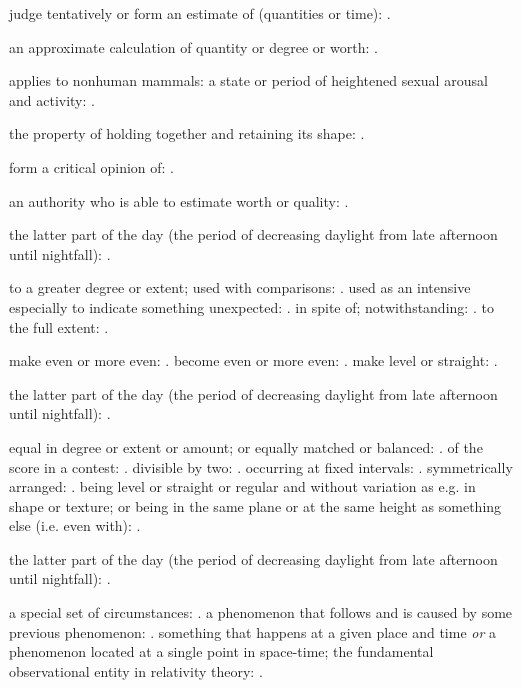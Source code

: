   judge tentatively or form an estimate of (quantities or time): .

  an approximate calculation of quantity or degree or worth: .

  applies to nonhuman mammals: a state or period of heightened sexual arousal and activity: .

  the property of holding together and retaining its shape: .

  form a critical opinion of: .

  an authority who is able to estimate worth or quality: .

  the latter part of the day (the period of decreasing daylight from late afternoon until nightfall): .

  to a greater degree or extent; used with comparisons: . used as an intensive especially to indicate something unexpected: . in spite of; notwithstanding: . to the full extent: .

  make even or more even: . become even or more even: . make level or straight: .

  the latter part of the day (the period of decreasing daylight from late afternoon until nightfall): .

  equal in degree or extent or amount; or equally matched or balanced: . of the score in a contest: . divisible by two: . occurring at fixed intervals: . symmetrically arranged: . being level or straight or regular and without variation as e.g. in shape or texture; or being in the same plane or at the same height as something else (i.e. even with): .

  the latter part of the day (the period of decreasing daylight from late afternoon until nightfall): .

  a special set of circumstances: . a phenomenon that follows and is caused by some previous phenomenon: . something that happens at a given place and time \textit{or} a phenomenon located at a single point in space-time; the fundamental observational entity in relativity theory: .


